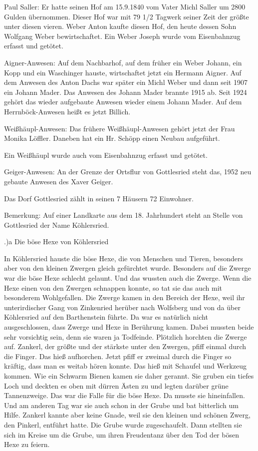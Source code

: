 \documentclass{book}
\begin{document}
Paul Saller: Er hatte seinen Hof am 15.9.1840 vom Vater Michl Saller um 2800
Gulden übernommen. Dieser Hof war mit 79 1/2 Tagwerk seiner Zeit der größte unter
diesen vieren. Weber Anton kaufte diesen Hof, den heute dessen Sohn Wolfgang
Weber bewirtschaftet. Ein Weber Joseph wurde vom Eisenbahnzug erfasst und
getötet.



Aigner-Anwesen: Auf dem Nachbarhof, auf dem früher ein Weber Johann, ein Kopp
und ein Waschinger hauste, wirtschaftet jetzt ein Hermann Aigner. Auf dem
Anwesen des Anton Dachs war später ein Michl Weber und dann seit 1907 ein Johann
Mader. Das Anwesen des Johann Mader brannte 1915 ab. Seit 1924 gehört das wieder
aufgebaute Anwesen wieder einem Johann Mader. Auf dem Herrnböck-Anwesen heißt es
jetzt Billich.

Weißhäupl-Anwesen: Das frühere Weißhäupl-Anwesen gehört jetzt der Frau Monika
Löffler. Daneben hat ein Hr. Schöpp einen Neubau aufgeführt.

Ein Weißhäupl wurde auch vom Eisenbahnzug erfasst und getötet.

Geiger-Anwesen: An der Grenze der Ortsflur von Gottlesried steht das, 1952 neu
gebaute Anwesen des Xaver Geiger.

Das Dorf Gottlesried zählt in seinen 7 Häusern 72 Einwohner.

Bemerkung: Auf einer Landkarte aus dem 18. Jahrhundert steht an Stelle von
Gottlesried der Name Köhlersried.

.)a Die böse Hexe von Köhlersried

In Köhlersried hauste die böse Hexe, die von Menschen und Tieren, besonders aber
von den kleinen Zwergen gleich gefürchtet wurde. Besonders auf die Zwerge war
die böse Hexe schlecht gelaunt. Und das wussten auch die Zwerge. Wenn die Hexe
einen von den Zwergen schnappen konnte, so tat sie das auch mit besonderem
Wohlgefallen. Die Zwerge kamen in den Bereich der Hexe, weil ihr unterirdischer
Gang von Zinkenried herüber nach Wolfsberg und von da über Köhlersried auf den
Barthenstein führte. Da war es natürlich nicht ausgeschlossen, dass Zwerge und
Hexe in Berührung kamen. Dabei mussten beide sehr vorsichtig sein, denn sie
waren ja Todfeinde. Plötzlich horchten die Zwerge auf. Zankerl, der größte und
der stärkste unter den Zwergen, pfiff einmal durch die Finger. Das hieß
aufhorchen. Jetzt pfiff er zweimal durch die Finger so kräftig, dass man es
weitab hören konnte. Das hieß mit Schaufel und Werkzeug kommen. Wie ein Schwarm
Bienen kamen sie daher gerannt. Sie gruben ein tiefes Loch und deckten es oben
mit dürren Ästen zu und legten darüber grüne Tannenzweige. Das war die Falle für
die böse Hexe. Da musste sie hineinfallen. Und am anderen Tag war sie auch schon
in der Grube und bat bitterlich um Hilfe. Zankerl kannte aber keine Gnade, weil
sie den kleinen und schönen Zwerg, den Pinkerl, entführt hatte. Die Grube wurde
zugeschaufelt. Dann stellten sie sich im Kreise um die Grube, um ihren
Freudentanz über den Tod der bösen Hexe zu feiern.
\end{document}
